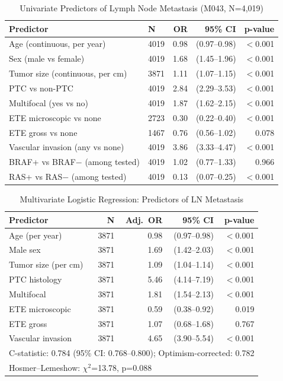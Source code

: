 \documentclass{article}
\begin{document}
\begin{table}[h]
\caption{Univariate Predictors of Lymph Node Metastasis (M043, N=4,019)}
\centering
\begin{tabular}{llrrr}
\toprule
Predictor & N & OR & 95\% CI & p-value \\
\midrule
Age (continuous, per year) & 4019 & 0.98 & (0.97–0.98) & $<$0.001 \\
Sex (male vs female) & 4019 & 1.68 & (1.45–1.96) & $<$0.001 \\
Tumor size (continuous, per cm) & 3871 & 1.11 & (1.07–1.15) & $<$0.001 \\
PTC vs non-PTC & 4019 & 2.84 & (2.29–3.53) & $<$0.001 \\
Multifocal (yes vs no) & 4019 & 1.87 & (1.62–2.15) & $<$0.001 \\
ETE microscopic vs none & 2723 & 0.30 & (0.22–0.40) & $<$0.001 \\
ETE gross vs none & 1467 & 0.76 & (0.56–1.02) & 0.078 \\
Vascular invasion (any vs none) & 4019 & 3.86 & (3.33–4.47) & $<$0.001 \\
BRAF+ vs BRAF− (among tested) & 4019 & 1.02 & (0.77–1.33) & 0.966 \\
RAS+ vs RAS− (among tested) & 4019 & 0.13 & (0.07–0.25) & $<$0.001 \\
\bottomrule
\end{tabular}
\end{table}
\vspace{1em}
\begin{table}[h]
\caption{Multivariate Logistic Regression: Predictors of LN Metastasis}
\centering
\begin{tabular}{lrrrr}
\toprule
Predictor & N & Adj.\ OR & 95\% CI & p-value \\
\midrule
Age (per year) & 3871 & 0.98 & (0.97--0.98) & $<$0.001 \\
Male sex & 3871 & 1.69 & (1.42--2.03) & $<$0.001 \\
Tumor size (per cm) & 3871 & 1.09 & (1.04--1.14) & $<$0.001 \\
PTC histology & 3871 & 5.46 & (4.14--7.19) & $<$0.001 \\
Multifocal & 3871 & 1.81 & (1.54--2.13) & $<$0.001 \\
ETE microscopic & 3871 & 0.59 & (0.38--0.92) & 0.019 \\
ETE gross & 3871 & 1.07 & (0.68--1.68) & 0.767 \\
Vascular invasion & 3871 & 4.65 & (3.90--5.54) & $<$0.001 \\
\midrule
\multicolumn{5}{l}{C-statistic: 0.784 (95\% CI: 0.768--0.800); Optimism-corrected: 0.782} \\
\multicolumn{5}{l}{Hosmer--Lemeshow: $\chi^2$=13.78, p=0.088} \\
\bottomrule
\end{tabular}
\end{table}
\end{document}
